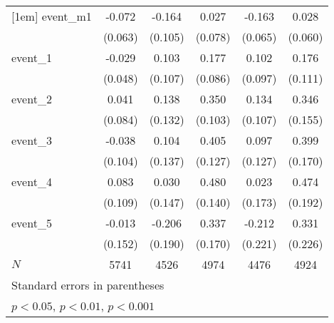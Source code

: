 {\begin{tabular}{l*{5}{c}}
[1em]
event\_m1    &      -0.072         &      -0.164         &       0.027         &      -0.163\sym{*}  &       0.028         \\
            &     (0.063)         &     (0.105)         &     (0.078)         &     (0.065)         &     (0.060)         \\
[1em]
event\_1     &      -0.029         &       0.103         &       0.177\sym{*}  &       0.102         &       0.176         \\
            &     (0.048)         &     (0.107)         &     (0.086)         &     (0.097)         &     (0.111)         \\
[1em]
event\_2     &       0.041         &       0.138         &       0.350\sym{***}&       0.134         &       0.346\sym{*}  \\
            &     (0.084)         &     (0.132)         &     (0.103)         &     (0.107)         &     (0.155)         \\
[1em]
event\_3     &      -0.038         &       0.104         &       0.405\sym{**} &       0.097         &       0.399\sym{*}  \\
            &     (0.104)         &     (0.137)         &     (0.127)         &     (0.127)         &     (0.170)         \\
[1em]
event\_4     &       0.083         &       0.030         &       0.480\sym{***}&       0.023         &       0.474\sym{*}  \\
            &     (0.109)         &     (0.147)         &     (0.140)         &     (0.173)         &     (0.192)         \\
[1em]
event\_5     &      -0.013         &      -0.206         &       0.337\sym{*}  &      -0.212         &       0.331         \\
            &     (0.152)         &     (0.190)         &     (0.170)         &     (0.221)         &     (0.226)         \\
\hline
\(N\)       &        5741         &        4526         &        4974         &        4476         &        4924         \\
\hline\hline
\multicolumn{6}{l}{\footnotesize Standard errors in parentheses}\\
\multicolumn{6}{l}{\footnotesize \sym{*} \(p<0.05\), \sym{**} \(p<0.01\), \sym{***} \(p<0.001\)}\\
\end{tabular}
}
